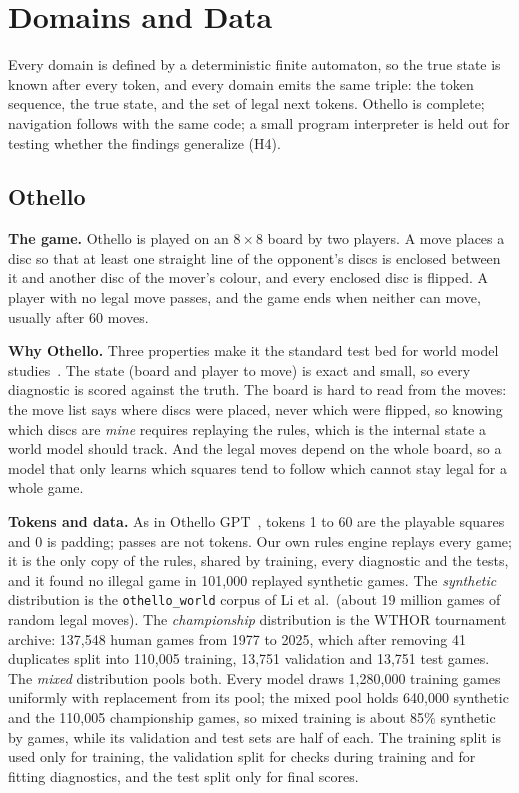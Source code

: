 \documentclass[journal]{IEEEtran}
\begin{document}
\section{Domains and Data}
\label{sec:data}

Every domain is defined by a deterministic finite automaton, so the true state is known after every token, and
every domain emits the same triple: the token sequence, the true state, and the set of legal next tokens. Othello is
complete; navigation follows with the same code; a small program interpreter is held out for testing whether the
findings generalize (H4).

\subsection{Othello}
\textbf{The game.} Othello is played on an $8\times8$ board by two players. A move places a disc so that at least
one straight line of the opponent's discs is enclosed between it and another disc of the mover's colour, and every
enclosed disc is flipped. A player with no legal move passes, and the game ends when neither can move, usually after
60 moves.

\textbf{Why Othello.} Three properties make it the standard test bed for world model
studies~\cite{li2023othello, nanda2023emergent}. The state (board and player to move) is exact and small, so every
diagnostic is scored against the truth. The board is hard to read from the moves: the move list says where discs
were placed, never which were flipped, so knowing which discs are \emph{mine} requires replaying the rules, which is
the internal state a world model should track. And the legal moves depend on the whole board, so a model that only
learns which squares tend to follow which cannot stay legal for a whole game.

\textbf{Tokens and data.} As in Othello GPT~\cite{li2023othello}, tokens 1 to 60 are the playable squares and 0 is
padding; passes are not tokens. Our own rules engine replays every game; it is the only copy of the rules, shared by
training, every diagnostic and the tests, and it found no illegal game in 101,000 replayed synthetic games. The
\emph{synthetic} distribution is the \texttt{othello\_world} corpus of Li et al.\ (about 19 million games of random
legal moves). The \emph{championship} distribution is the WTHOR tournament archive: 137,548 human games from 1977 to
2025, which after removing 41 duplicates split into 110,005 training, 13,751 validation and 13,751 test games. The
\emph{mixed} distribution pools both. Every model draws 1,280,000 training games uniformly with replacement from its
pool; the mixed pool holds 640,000 synthetic and the 110,005 championship games, so mixed training is about 85\%
synthetic by games, while its validation and test sets are half of each. The training split is used only for
training, the validation split for checks during training and for fitting diagnostics, and the test split only for
final scores.
\end{document}
